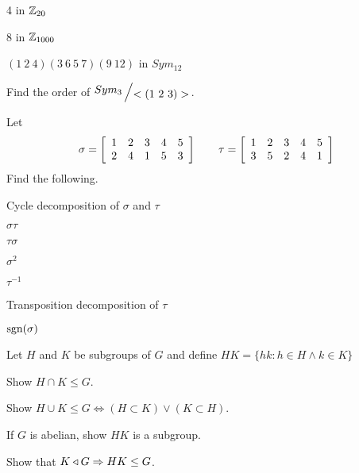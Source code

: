 \begin{compactenum}
    \begin{compactenum}
        \item 4 in $\mathbb{Z}_{20}$
        \item 8 in $\mathbb{Z}_{1000}$
        \item $(1\ 2\ 4)(3\ 6\ 5\ 7)(9\ 12)$ in $Sym_{12}$
    \end{compactenum}
    \item Find the order of $\fgroup{Sym_{3}}{<(1\ 2\ 3)>}$.
    \item Let
    \[
        \sigma=
        \left[
            \begin{array}{c c c c c}
                1 & 2 & 3 & 4 & 5\\
                2 & 4 & 1 & 5 & 3
            \end{array}
        \right]
        \qquad
        \tau=
        \left[
            \begin{array}{c c c c c}
                1 & 2 & 3 & 4 & 5\\
                3 & 5 & 2 & 4 & 1
            \end{array}
        \right]
    \]
    Find the following.
    \begin{compactenum}
        \item Cycle decomposition of $\sigma$ and $\tau$
        \item $\sigma\tau$
        \item $\tau\sigma$
        \item $\sigma^{2}$
        \item $\tau^{-1}$
        \item Transposition decomposition of $\tau$
        \item $\text{sgn}(\sigma)$
    \end{compactenum}

    \item Let $H$ and $K$ be subgroups of $G$ and define $HK=\{hk:h\in H\land k\in K\}$
    \begin{compactenum}
        \item Show $H\cap K\leq G$.
        \item Show $H \cup K\leq G\iff (H\subset K)\lor (K\subset H)$.
        \item If $G$ is abelian, show $HK$ is a subgroup.
        \item Show that $K\triangleleft G\Rightarrow HK\leq G$.
    \end{compactenum}
\end{compactenum}
